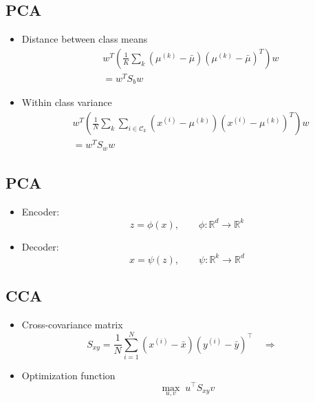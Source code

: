 \documentclass[11pt]{article}
\begin{document}
\subsection{PCA}
\begin{itemize}
	\item Distance between class means
	      \[
		      \begin{aligned}
			       & w^T \left( \frac{1}{K} \sum_{k} (\mu^{(k)} - \bar{\mu})(\mu^{(k)} - \bar{\mu})^T \right) w \\
			       & = w^T S_b w
		      \end{aligned}
	      \]
	\item Within class variance
	      \[
		      \begin{aligned}
			       & w^T \left( \frac{1}{N} \sum_{k} \sum_{i \in \mathcal{C}_k} (x^{(i)} - \mu^{(k)})(x^{(i)} - \mu^{(k)})^T \right) w \\
			       & = w^T S_w w
		      \end{aligned}
	      \]

\end{itemize}

\subsection{PCA}
\begin{itemize}
	\item Encoder:
	      \[
		      z = \phi(x), \qquad \phi: \mathbb{R}^d \rightarrow \mathbb{R}^k
	      \]

	\item Decoder:
	      \[
		      \hat{x} = \psi(z), \qquad \psi: \mathbb{R}^k \rightarrow \mathbb{R}^d
	      \]
\end{itemize}
\subsection{CCA}
\begin{itemize}
	\item Cross-covariance matrix
	      \[
		      S_{xy} = \frac{1}{N} \sum_{i=1}^N (x^{(i)} - \bar{x})(y^{(i)} - \bar{y})^\top
		      \quad \Rightarrow \quad
	      \]
	\item Optimization function
	      \[
		      \max_{u,v} \; u^\top S_{xy} v
	      \]
\end{itemize}
\end{document}

